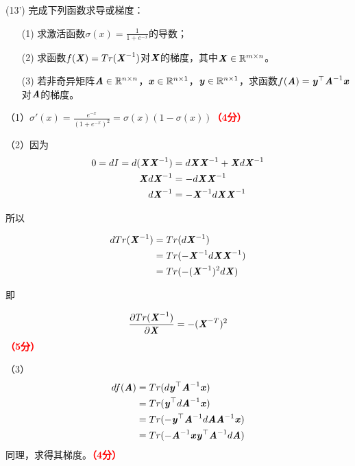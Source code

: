 \documentclass[12pt,a4paper,openany,twoside]{ctexbook}
\begin{document}
\begin{exercise}(13')
	完成下列函数求导或梯度：
	\begin{itemize}
		\item [(1)] 求激活函数$\sigma(x)=\frac{1}{1+e^{-x}}$的导数；
		\item [(2)] 求函数$f(\MX) = Tr(\MX^{-1})$对$\MX$的梯度，其中$\MX \in \NR^{m\times n} $。
		\item [(3)] 若非奇异矩阵$\MA \in \NR^{n \times n}$，$\Vx \in \NR^{n \times 1}$，$\Vy \in \NR^{n \times 1}$，求函数$f(\MA) = \Vy^\top \MA^{-1} \Vx$对$\MA$的梯度。
	\end{itemize}
\end{exercise}
\begin{Solution}
	（1）$\sigma'(x)=\frac{e^{-x}}{(1+e^{-x})^2}=\sigma(x)(1-\sigma(x))$\hfill \textcolor{red}{\textbf{（4分）}}
	
	（2）因为
	$$
	\begin{aligned}
		0=d I=d(\MX \MX^{-1})&= d \MX \MX^{-1}+\MX d\MX^{-1}\\
		\MX d\MX^{-1}&=-d\MX \MX^{-1}\\
		d\MX^{-1}&=-\MX^{-1}d\MX \MX^{-1}
	\end{aligned}
	$$
	
	所以
	
	$$
	\begin{aligned}
		dTr(\MX^{-1}) &= Tr(d\MX^{-1})\\
		&= Tr(-\MX^{-1}d\MX \MX^{-1})\\
		&= Tr(-(\MX^{-1})^{2}d\MX)
	\end{aligned}
	$$
	
	即
	
	$$
	\begin{aligned}
		\frac{\partial Tr(\MX^{-1})}{\partial \MX} = -(\MX^{-T})^{2}
	\end{aligned}
	$$\hfill \textcolor{red}{\textbf{（5分）}}
	
	（3）$$
	\begin{aligned}
		d f(\MA) &= Tr(d \Vy^\top \MA^{-1} \Vx)\\
		&= Tr( \Vy^\top d \MA^{-1} \Vx)\\
		&= Tr(- \Vy^\top \MA^{-1}d\MA \MA^{-1} \Vx)\\
		&= Tr(- \MA^{-1} \Vx \Vy^\top \MA^{-1}d\MA  )
	\end{aligned}
	$$同理，求得其梯度。\hfill \textcolor{red}{\textbf{（4分）}}
\end{Solution}
\end{document}
